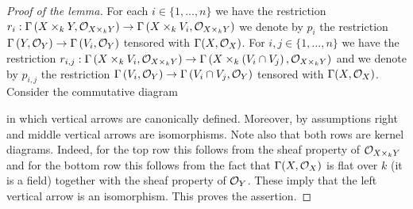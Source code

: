 \begin{proof}[Proof of the lemma]
For each $i\in \{1,...,n\}$ we have the restriction $r_i:\Gamma\left(X \times_kY,{\mathcal O}_{X \times_kY}\right)\rightarrow \Gamma\left(X\times_kV_i,{\mathcal O}_{X\times_kY}\right)$ we denote by $p_i$ the restriction $\Gamma\left(Y,{\mathcal O}_{Y}\right)\rightarrow \Gamma\left(V_i,{\mathcal O}_{Y}\right)$ tensored with $\Gamma(X,{\mathcal O}_X)$. For $i, j \in \{1,...,n\}$ we have the restriction $r_{i,j}:\Gamma\left(X \times_kV_i,{\mathcal O}_{X \times_kY}\right)\rightarrow \Gamma\left(X\times_k\left(V_i\cap V_j\right),{\mathcal O}_{X\times_kY}\right)$ and we denote by $p_{i,j}$ the restriction $\Gamma\left(V_i,{\mathcal O}_{Y}\right)\rightarrow \Gamma\left(V_i\cap V_j ,{\mathcal O}_{Y}\right)$ tensored with $\Gamma(X,{\mathcal O}_X)$. Consider the commutative diagram
\begin{center}
\hspace*{-1.5cm}
\end{center}
in which vertical arrows are canonically defined. Moreover, by assumptions right and middle vertical arrows are isomorphisms. Note also that both rows are kernel diagrams. Indeed, for the top row this follows from the sheaf property of ${\mathcal O}_{X\times_k Y}$ and for the bottom row this follows from the fact that $\Gamma(X,{\mathcal O}_X)$ is flat over $k$ (it is a field) together with the sheaf property of ${\mathcal O}_Y$. These imply that the left vertical arrow is an isomorphism. This proves the assertion.
\end{proof}


